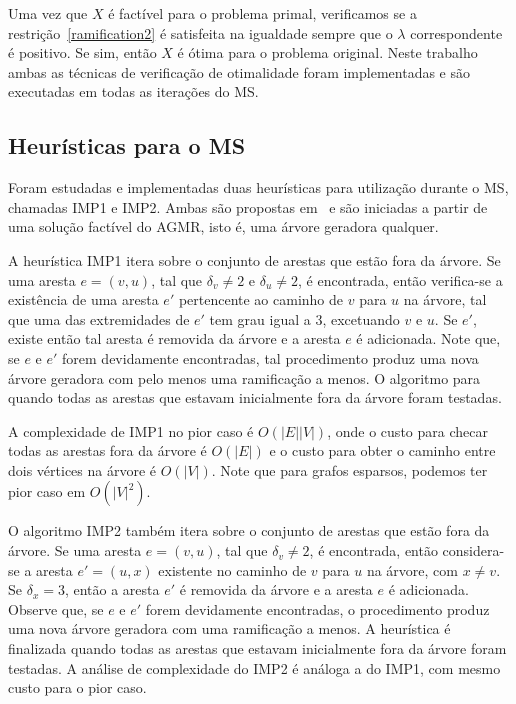 \documentclass[12pt, a4paper]{article}
\theoremstyle{plain}
\theoremstyle{definition}
\theoremstyle{remark}
\begin{document}
Uma vez que $X$ é factível para o problema primal, verificamos se a restrição~\eqref{ramification2} é satisfeita na igualdade sempre que o $\lambda$ correspondente é positivo. Se sim, então $X$ é ótima para o problema original. Neste trabalho ambas as técnicas de verificação de otimalidade foram implementadas e são executadas em todas as iterações do MS.

\subsection{Heurísticas para o MS}

Foram estudadas e implementadas duas heurísticas para utilização durante o MS, chamadas IMP1 e IMP2. Ambas são propostas em~\cite{Marin2015} e são iniciadas a partir de uma solução factível do AGMR, isto é, uma árvore geradora qualquer.

A heurística IMP1 itera sobre o conjunto de arestas que estão fora da árvore. Se uma aresta $e = (v, u)$, tal que $\delta_v \neq 2$ e $\delta_u \neq 2$, é encontrada, então verifica-se a existência de uma aresta $e'$ pertencente ao caminho de $v$ para $u$ na árvore, tal que uma das extremidades de $e'$ tem grau igual a $3$, excetuando $v$ e $u$. Se $e'$, existe então tal aresta é removida da árvore e a aresta $e$ é adicionada. Note que, se $e$ e $e'$ forem devidamente encontradas, tal procedimento produz uma nova árvore geradora com pelo menos uma ramificação a menos. O algoritmo para quando todas as arestas que estavam inicialmente fora da árvore foram testadas.

A complexidade de IMP1 no pior caso é $O(|E||V|)$, onde o custo para checar todas as arestas fora da árvore é $O(|E|)$ e o custo para obter o caminho entre dois vértices na árvore é $O(|V|)$. Note que para grafos esparsos, podemos ter pior caso em $O(|V|^2)$.

O algoritmo IMP2 também itera sobre o conjunto de arestas que estão fora da árvore. Se uma aresta $e = (v, u)$, tal que $\delta_v \neq 2$, é encontrada, então considera-se a aresta $e' = (u, x)$ existente no caminho de $v$ para $u$ na árvore, com $x \neq v$. Se $\delta_x = 3$, então a aresta $e'$ é removida da árvore e a aresta $e$ é adicionada. Observe que, se $e$ e $e'$ forem devidamente encontradas, o procedimento produz uma nova árvore geradora com uma ramificação a menos. A heurística é finalizada quando todas as arestas que estavam inicialmente fora da árvore foram testadas. A análise de complexidade do IMP2 é análoga a do IMP1, com mesmo custo para o pior caso.
\end{document}
